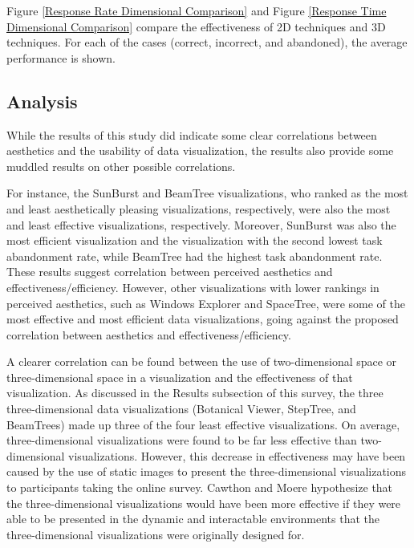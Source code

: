 \documentclass[twocolumn]{article}
\newcommand{\forceindent}{\leavevmode{\parindent=2em\indent}}
\begin{document}
		Figure \ref{Response Rate Dimensional Comparison} and Figure \ref{Response Time Dimensional Comparison} compare the effectiveness of 2D techniques and 3D techniques. For each of the cases (correct, incorrect, and abandoned), the average performance is shown.\\

		\subsection{Analysis}
		
		\forceindent While the results of this study did indicate some clear correlations between aesthetics and the usability of data visualization, the results also provide some muddled results on other possible correlations.
		
		\forceindent For instance, the SunBurst and BeamTree visualizations, who ranked as the most and least aesthetically pleasing visualizations, respectively, were also the most and least effective visualizations, respectively. Moreover, SunBurst was also the most efficient visualization and the visualization with the second lowest task abandonment rate, while BeamTree had the highest task abandonment rate. These results suggest correlation between perceived aesthetics and effectiveness/efficiency. However, other visualizations with lower rankings in perceived aesthetics, such as Windows Explorer and SpaceTree, were some of the most effective and most efficient data visualizations, going against the proposed correlation between aesthetics and effectiveness/efficiency.
		
		\forceindent A clearer correlation can be found between the use of two-dimensional space or three-dimensional space in a visualization and the effectiveness of that visualization. As discussed in the Results subsection of this survey, the three three-dimensional data visualizations (Botanical Viewer, StepTree, and BeamTrees) made up three of the four least effective visualizations. On average, three-dimensional visualizations were found to be far less effective than two-dimensional visualizations. However, this decrease in effectiveness may have been caused by the use of static images to present the three-dimensional visualizations to participants taking the online survey. Cawthon and Moere hypothesize that the three-dimensional visualizations would have been more effective if they were able to be presented in the dynamic and interactable environments that the three-dimensional visualizations were originally designed for.
		
\end{document}
